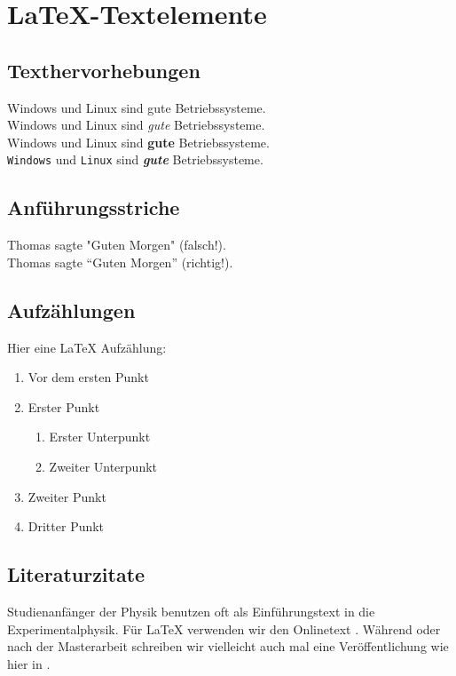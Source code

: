 \chapter{\LaTeX{}-Textelemente}
\label{chap:latex_elemente}
%
\section{Texthervorhebungen}
Windows und Linux sind gute Betriebssysteme.  \\
Windows und Linux sind \emph{gute} Betriebssysteme.  \\
Windows und Linux sind \textbf{gute} Betriebssysteme.  \\
\texttt{Windows} und \texttt{Linux} sind
\emph{\textbf{gute}} Betriebssysteme.  \\
%
\section{Anführungsstriche}
Thomas sagte "Guten Morgen" (falsch!). \\
Thomas sagte \enquote{Guten Morgen} (richtig!).
%
\section{Aufzählungen}
%
Hier eine \LaTeX{} Aufzählung:
\begin{enumerate}
  \item Vor dem ersten Punkt
  \item Erster Punkt
  \begin{enumerate}
    \item Erster Unterpunkt
    \item Zweiter Unterpunkt
  \end{enumerate}
  \item Zweiter Punkt
  \item Dritter Punkt   
\end{enumerate}
%
\section{Literaturzitate}
\label{sec:literatur}
Studienanfänger der Physik benutzen oft \cite{gerthsen2013physik} als
Einführungstext in die Experimentalphysik. Für \LaTeX{} verwenden wir
den Onlinetext \cite{daniel2015l2kurz}. Während oder nach der
Masterarbeit schreiben wir vielleicht auch mal eine Veröffentlichung
wie hier in \cite{heymans2006shear}.
%
